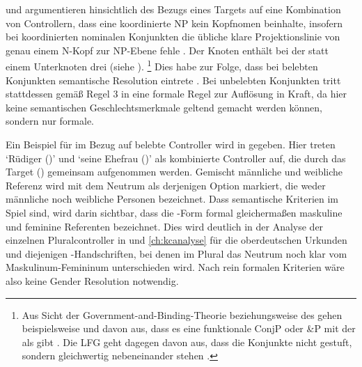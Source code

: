 \citet[182--183]{wechslerzlatic2003} und \citet[576]{wechsler2009}
argumentieren hinsichtlich des Bezugs eines Targets auf eine
Kombination von Controllern, dass eine koordinierte NP kein
Kopf\-nomen beinhalte, insofern bei koordinierten
nominalen Konjunkten die übliche klare Projektionslinie von genau einem N-Kopf
zur NP-Ebene fehle \autocites[183, Fußnote 85]{wechslerzlatic2003}[585, Fußnote
7]{wechsler2009}. Der Knoten  enthält bei der  statt
einem Unterknoten drei (siehe
).%
%
	\footnote{Aus Sicht der Government-and-Binding-Theorie beziehungsweise des  gehen beispielsweise
	\textcites{johannessen1998}{johannessen2005} und \citet{shen2019} davon
	aus, dass es eine funktionale ConjP oder \&P mit der  als
	 gibt \autocite[dagegen aber][]{borsley2005}. Die
	LFG geht dagegen davon aus, dass die
	Konjunkte nicht gestuft, sondern gleichwertig nebeneinander stehen
	\autocites[vgl.~z.\,B.][]{peterson2004}{sadlernordlinger2006}.}
%
Dies habe zur Folge, dass bei belebten Konjunkten semantische Resolution
eintrete \autocites[183]{wechslerzlatic2003}[576]{wechsler2009}. Bei
unbelebten Konjunkten tritt stattdessen gemäß Regel 3 in
 eine formale Regel zur Auflösung in
Kraft, da hier keine semantischen
Geschlechtsmerkmale geltend gemacht
werden können, sondern nur formale.

Ein Beispiel für  im Bezug auf belebte Controller wird
in  gegeben. Hier treten  `Rüdiger (\MascM)' und
 `seine Ehefrau (\FemF)' als kombinierte Controller auf, die
durch das Target  (\NeutMF) gemeinsam aufgenommen werden.
Gemischt männliche und weibliche Referenz wird mit dem Neutrum als derjenigen
Option markiert, die weder männliche noch weibliche Personen bezeichnet. Dass
semantische Kriterien im Spiel sind, wird darin sichtbar, dass die
-Form formal gleichermaßen maskuline und feminine Referenten
bezeichnet. Dies wird deutlich in der Analyse der einzelnen Pluralcontroller in
 und \ref{ch:kcanalyse} für die
oberdeutschen Urkunden und diejenigen \KC{}-Handschriften, bei
denen im Plural das Neutrum noch klar vom Maskulinum-Femininum unterschieden
wird. Nach rein formalen Kriterien wäre also keine Gender Resolution notwendig.

